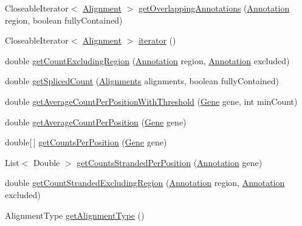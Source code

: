 \begin{DoxyCompactItemize}
Closeable\+Iterator$<$ \hyperlink{interfaceumms_1_1core_1_1alignment_1_1_alignment}{Alignment} $>$ \hyperlink{classumms_1_1core_1_1model_1_1_j_c_s_alignment_model_ada32da9c62bd9a077cc24cc9921576da}{get\+Overlapping\+Annotations} (\hyperlink{interfaceumms_1_1core_1_1annotation_1_1_annotation}{Annotation} region, boolean fully\+Contained)
\item 
Closeable\+Iterator$<$ \hyperlink{interfaceumms_1_1core_1_1alignment_1_1_alignment}{Alignment} $>$ \hyperlink{classumms_1_1core_1_1model_1_1_j_c_s_alignment_model_ae41f39ab7b1d13fd6915e1d0405c78a7}{iterator} ()
\item 
double \hyperlink{classumms_1_1core_1_1model_1_1_j_c_s_alignment_model_a1c7bbf1ce516ae5fca860b72ecebe159}{get\+Count\+Excluding\+Region} (\hyperlink{interfaceumms_1_1core_1_1annotation_1_1_annotation}{Annotation} region, \hyperlink{interfaceumms_1_1core_1_1annotation_1_1_annotation}{Annotation} excluded)
\item 
double \hyperlink{classumms_1_1core_1_1model_1_1_j_c_s_alignment_model_af17880a4e617b7603bca490f64fa4cce}{get\+Spliced\+Count} (\hyperlink{classbroad_1_1pda_1_1datastructures_1_1_alignments}{Alignments} alignments, boolean fully\+Contained)
\item 
double \hyperlink{classumms_1_1core_1_1model_1_1_j_c_s_alignment_model_a2e4fdd6d362d1ccd58c61d6c1bbeccb1}{get\+Average\+Count\+Per\+Position\+With\+Threshold} (\hyperlink{classumms_1_1core_1_1annotation_1_1_gene}{Gene} gene, int min\+Count)
\item 
double \hyperlink{classumms_1_1core_1_1model_1_1_j_c_s_alignment_model_ac64d0167e26483541e58e6794968629d}{get\+Average\+Count\+Per\+Position} (\hyperlink{classumms_1_1core_1_1annotation_1_1_gene}{Gene} gene)
\item 
double\mbox{[}$\,$\mbox{]} \hyperlink{classumms_1_1core_1_1model_1_1_j_c_s_alignment_model_ab36d1b8f1a85207bbb5f2f4b1dd030d6}{get\+Counts\+Per\+Position} (\hyperlink{classumms_1_1core_1_1annotation_1_1_gene}{Gene} gene)
\item 
List$<$ Double $>$ \hyperlink{classumms_1_1core_1_1model_1_1_j_c_s_alignment_model_a03d3b9837dce06b17b424dd35e7bd012}{get\+Counts\+Stranded\+Per\+Position} (\hyperlink{interfaceumms_1_1core_1_1annotation_1_1_annotation}{Annotation} gene)
\item 
double \hyperlink{classumms_1_1core_1_1model_1_1_j_c_s_alignment_model_ad96d29e6f7416f7e54e0b44c1e22bfa9}{get\+Count\+Stranded\+Excluding\+Region} (\hyperlink{interfaceumms_1_1core_1_1annotation_1_1_annotation}{Annotation} region, \hyperlink{interfaceumms_1_1core_1_1annotation_1_1_annotation}{Annotation} excluded)
\item 
Alignment\+Type \hyperlink{classumms_1_1core_1_1model_1_1_j_c_s_alignment_model_a6939ce3bb7ecb8dd46cc30bd0b88c492}{get\+Alignment\+Type} ()
\end{DoxyCompactItemize}

